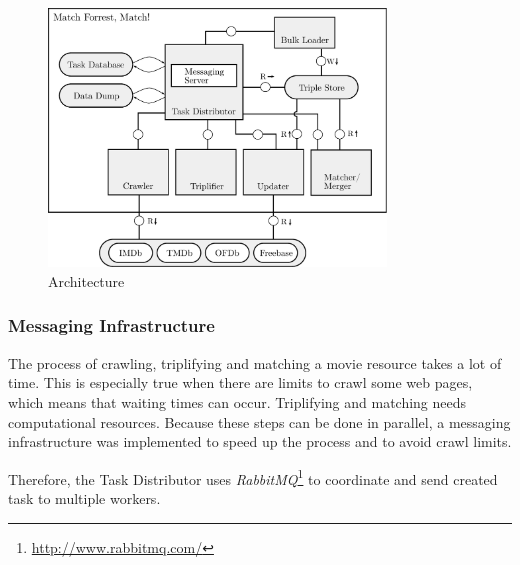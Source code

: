 \begin{figure}[ht]
  \begin{center}
  \includegraphics[width=0.8\textwidth]{images/architecture.pdf}
  \end{center}
  \caption{Architecture}
  \label{fig_architecture}
\end{figure}

\subsubsection{Messaging Infrastructure}
\label{subsubsec_messaging_infrastructure}

The process of crawling, triplifying and matching a movie resource takes a lot of time.
This is especially true when there are limits to crawl some web pages, which means that waiting times can occur.
Triplifying and matching needs computational resources.
Because these steps can be done in parallel, a messaging infrastructure was implemented to speed up the process and to avoid crawl limits.

Therefore, the Task Distributor uses \emph{RabbitMQ}\footnote{\url{http://www.rabbitmq.com/}} to coordinate and send created task to multiple workers.

